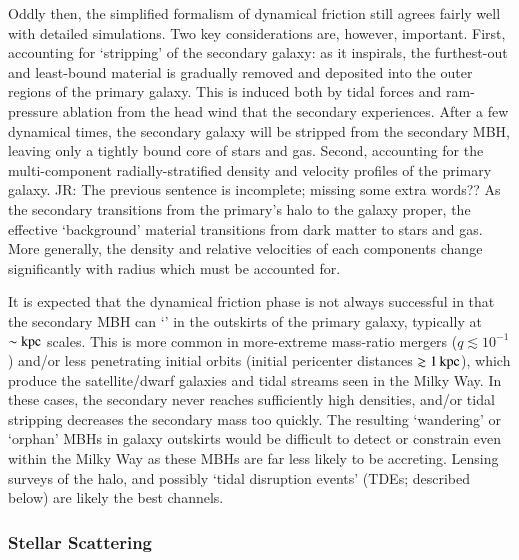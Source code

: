 \documentclass[onecolumn,authoryear]{els-mrw}
\begin{document}
Oddly then, the simplified formalism of dynamical friction still agrees fairly well with detailed simulations.  Two key considerations are, however, important.  First, accounting for `stripping' of the secondary galaxy: as it inspirals, the furthest-out and least-bound material is gradually removed and deposited into the outer regions of the primary galaxy.  This is induced both by tidal forces and ram-pressure ablation from the head wind that the secondary experiences.  After a few dynamical times, the secondary galaxy will be stripped from the secondary MBH, leaving only a tightly bound core of stars and gas.  Second, accounting for the multi-component radially-stratified density and velocity profiles of the primary galaxy. {\color{red}JR: The previous sentence is incomplete; missing some extra words??} As the secondary transitions from the primary's halo to the galaxy proper, the effective `background' material transitions from dark matter to stars and gas.  More generally, the density and relative velocities of each components change significantly with radius which must be accounted for.

It is expected that the dynamical friction phase is not always successful in that the secondary MBH can `' in the outskirts of the primary galaxy, typically at $\sim \mathrm{kpc}$ scales.  This is more common in more-extreme mass-ratio mergers ($q \lesssim 10^{-1}$) and/or less penetrating initial orbits (initial pericenter distances $\gtrsim 1 \, \mathrm{kpc}$), which produce the satellite/dwarf galaxies and tidal streams seen in the Milky Way.  In these cases, the secondary never reaches sufficiently high densities, and/or tidal stripping decreases the secondary mass too quickly.  The resulting `wandering' or `orphan' MBHs in galaxy outskirts would be difficult to detect or constrain even within the Milky Way as these MBHs are far less likely to be accreting.  Lensing surveys of the halo, and possibly `tidal disruption events' (TDEs; described below) are likely the best channels.

\subsubsection{Stellar Scattering}\label{sec:binary_evolution_scattering}
\end{document}
